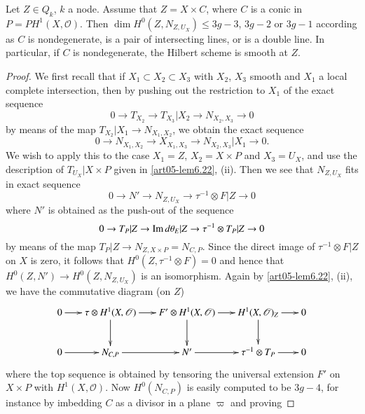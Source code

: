 \begin{proposition}\label{art05-prop8.5}
Let $Z\in Q_{k}$, $k$ a node. Assume that $Z=X\times C$, where $C$ is
a conic in $P=PH^{1}(X,\mathscr{O})$. Then $\dim
H^{0}(Z,N_{Z,U_{X}})\leq 3g-3$, $3g-2$ or $3g-1$ according as $C$ is
nondegenerate, is a pair of intersecting lines, or is a double
line. In particular, if $C$ is nondegenerate, the Hilbert scheme is
smooth at $Z$.
\end{proposition}

\begin{proof}
We first recall \cite[SGA 6, VII, Proposition 1.7]{art05-key9} that if
$X_{1}\subset X_{2}\subset X_{3}$ with $X_{2}$, $X_{3}$ smooth and
$X_{1}$ a local complete intersection, then by pushing out the
restriction to $X_{1}$ of the exact sequence
$$
0\to T_{X_{2}}\to T_{X_{3}}|X_{2}\to N_{X_{2},X_{3}}\to 0
$$
by means of the map $T_{X_{2}}|X_{1}\to N_{X_{1},X_{2}}$, we obtain
the exact sequence
$$
0\to N_{X_{1},X_{2}}\to X_{X_{1},X_{3}}\to N_{X_{2},X_{3}}|X_{1}\to 0.
$$
We wish to apply this to the case $X_{1}=Z$, $X_{2}=X\times P$ and
$X_{3}=U_{X}$, and use the description of $T_{U_X}|X\times P$ given in 
\ref{art05-lem6.22}, (ii). Then we see that $N_{Z,U_{X}}$ fits in
exact sequence
\setcounter{equation}{5}
\begin{equation}
0\to N'\to N_{Z,U_{X}}\to \tau^{-1}\otimes F|Z\to 0\label{art05-eq8.6}
\end{equation}\pageoriginale
where $N'$ is obtained as the push-out of the sequence
$$
0\to T_{P}|Z\to \operatorname{Im} d\theta_{E}|Z\to \tau^{-1}\otimes T_{P}|Z\to 0
$$
by means of the map $T_{P}|Z\to N_{Z,X\times P}=N_{C,P}$. Since the
direct image of $\tau^{-1}\otimes F|Z$ on $X$ is zero, it follows that
$H^{0}(Z,\tau^{-1}\otimes F)=0$ and hence that $H^{0}(Z,N')\to
H^{0}(Z,N_{Z,U_{X}})$ is an isomorphism. Again by \ref{art05-lem6.22},
(ii), we have the commutative diagram (on $Z$)
\begin{equation}
\vcenter{
\xymatrix@C=.6cm{
0\ar[r] & \tau\otimes H^{1}(X,\mathscr{O})\ar[r]\ar[d] & F'\otimes
H^{1}(X,\mathscr{O})\ar[r]\ar[d] & H^{1}(X,\mathscr{O})_{Z}\ar[r]\ar[d] & 0\\
0\ar[r] & N_{C,P}\ar[r] & N'\ar[r] & \tau^{-1}\otimes T_{P}\ar[r] & 0
}}\label{art05-eq8.7}
\end{equation}
where the top sequence is obtained by tensoring the universal
extension $F'$ on $X\times P$ with $H^{1}(X,\mathscr{O})$. Now
$H^{0}(N_{C,P})$ is easily computed to be $3g-4$, for instance by
imbedding $C$ as a divisor in a plane $\varpi$ and proving

\end{proof}
